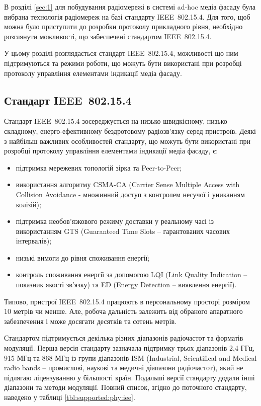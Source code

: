\documentclass[a4paper,ukrainian,utf8,nocolumnsxix,floatsection,equationsection]{eskdtext}
\newcommand{\iee}[0]{IEEE~802.15.4\xspace}
\newcommand{\engtxt}[1]{\foreignlanguage{english}{#1}}
\begin{document}
В розділі \ref{sec:1} для побудування радіомережі в системі ad-hoc медіа фасаду була вибрана технологія радіомереж на базі стандарту \iee. Для того, щоб можна було приступити до розробки протоколу прикладного рівня, необхідно розглянути можливості, що забеспечені стандартом \iee.

У цьому розділі розглядається стандарт \iee, можливості що ним підтримуються та режими роботи, що можуть бути використані при розробці протоколу управління елементами індикації медіа фасаду. 

\subsection{Стандарт \iee}
\label{sub:ieee:standard}


Стандарт \iee зосереджується на низько швидкісному, низько складному, енерго-ефективному бездротовому радіозв’язку серед пристроїв. Деякі з найбільш важливих особливостей стандарту, що можуть бути використані при розробці протоколу управління елементами індикації медіа фасаду, є:
\begin{itemize}
	\item підтримка мережевих топологій зірка та Peer-to-Peer;
	\item використання алгоритму CSMA-CA (\engtxt{Carrier Sense Multiple Access with Collision Avoidance} - множинний доступ з контролем несучої і униканням колізій);
	\item підтримка необов’язкового режиму доставки у реальному часі із використанням GTS (Guaranteed Time Slots – гарантованих  часових інтервалів);
	\item низькі вимоги до рівня споживання енергії;
	\item контроль споживання енергії за допомогою LQI (Link Quality Indication – показник якості зв’язку) та ED (Energy Detection – виявлення енергії).
\end{itemize}

Типово, пристрої \iee працюють в персональному просторі розміром 10 метрів чи менше. Але, робоча дальність залежить від обраного апаратного забезпечення і може досягати десятків та сотень метрів.

Стандартом підтримується декілька різних діапазонів радіочастот та форматів модуляції. Перша версія стандарту зазначала підтримку трьох діапазонів 2,4 ГГц, 915 МГц та 868 МГц із групи діапазонів ISM (Industrial, Scientifical and Medical radio bands – промислові, наукові та медичні діапазони радіочастот), який не підлягаю ліцензуванню у більшості країн. Подальші версії стандарту додали інші діапазони та методи модуляції. Повний список, згідно до поточного стандарту, наведено у таблиці \ref{tbl:supported:phy:iee}.
\end{document}
